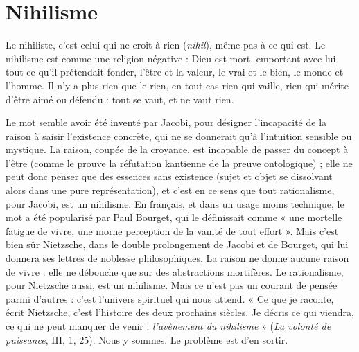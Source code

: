 \section{Nihilisme}
Le nihiliste, c’est celui qui ne croit à rien ({\it nihil}), même pas à
ce qui est. Le nihilisme est comme une religion négative :
Dieu est mort, emportant avec lui tout ce qu’il prétendait fonder, l’être et la
valeur, le vrai et le bien, le monde et l’homme. Il n’y a plus rien que le rien, en
tout cas rien qui vaille, rien qui mérite d’être aimé ou défendu : tout se vaut, et
ne vaut rien.

Le mot semble avoir été inventé par Jacobi, pour désigner l’incapacité de la
raison à saisir l’existence concrète, qui ne se donnerait qu’à l'intuition sensible
ou mystique. La raison, coupée de la croyance, est incapable de passer du
concept à l’être (comme le prouve la réfutation kantienne de la preuve ontologique) ;
elle ne peut donc penser que des essences sans existence (sujet et
objet se dissolvant alors dans une pure représentation), et c’est en ce sens que
tout rationalisme, pour Jacobi, est un nihilisme. En français, et dans un usage
moins technique, le mot a été popularisé par Paul Bourget, qui le définissait
comme « une mortelle fatigue de vivre, une morne perception de la vanité de
tout effort ». Mais c’est bien sûr Nietzsche, dans le double prolongement de
Jacobi et de Bourget, qui lui donnera ses lettres de noblesse philosophiques. La
raison ne donne aucune raison de vivre : elle ne débouche que sur des abstractions
mortifères. Le rationalisme, pour Nietzsche aussi, est un nihilisme. Mais
ce n’est pas un courant de pensée parmi d’autres : c’est l’univers spirituel qui
nous attend. « Ce que je raconte, écrit Nietzsche, c’est l’histoire des deux prochains
siècles. Je décris ce qui viendra, ce qui ne peut manquer de venir : {\it l'avènement
du nihilisme} » ({\it La volonté de puissance}, III, 1, 25). Nous y sommes. Le
problème est d’en sortir.

